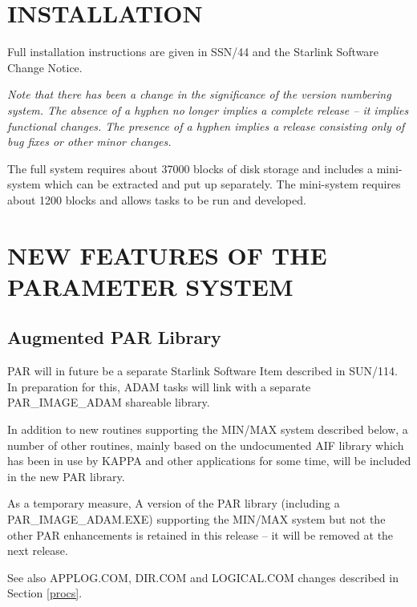 \newpage
  \setlength{\parskip}{0mm}
  \tableofcontents
  \setlength{\parskip}{\medskipamount}
  \markright{\stardocname}

\section{INSTALLATION}
Full installation instructions are given in SSN/44 and the Starlink Software 
Change Notice.

{\em Note that there has been a change in the significance of the version 
numbering system. The absence of a hyphen no longer implies a complete 
release -- it implies functional changes. 
The presence of a hyphen implies a release consisting only of bug fixes or 
other minor changes.}

The full system requires about 37000 blocks of disk storage and includes a
mini-system which can be extracted and put up separately. The mini-system
requires about 1200 blocks and allows tasks to be run and  developed.


\section{NEW FEATURES OF THE PARAMETER SYSTEM}

\subsection{Augmented PAR Library}
PAR will in future be a separate Starlink Software Item described in 
SUN/114.
In preparation for this, ADAM tasks will link with a separate 
PAR\_IMAGE\_ADAM shareable library.

In addition to new routines supporting the MIN/MAX system described below,
a number of other routines, mainly based on the undocumented AIF library
which has been in use by KAPPA and other applications for some time, will
be included in the new PAR library.

As a temporary measure, A version of the PAR library (including a
PAR\_IMAGE\_ADAM.EXE) supporting the MIN/MAX system but not the other PAR 
enhancements is retained in this release --
it will be removed at the next release. 

See also APPLOG.COM, DIR.COM and LOGICAL.COM changes described in 
Section \ref{procs}.

